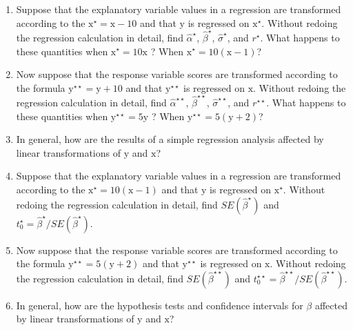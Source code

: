 \documentclass[]{article}
\begin{document}
\begin{enumerate}
\def\labelenumi{\arabic{enumi}.}
\item
  Suppose that the explanatory variable values in a regression are
  transformed according to the \(\mathrm{x}^{\star}=\mathrm{x}-10\) and
  that \(\mathrm{y}\) is regressed on \(\mathrm{x}^{\star}\). Without
  redoing the regression calculation in detail, find
  \(\hat{\alpha}^{\star}\), \(\hat{\beta}^{\star}\),
  \(\hat{\sigma}^{\star}\), and \(r^{\star}\). What happens to these
  quantities when \(\mathrm{x}^{\star}=10\mathrm{x}\) ? When
  \(\mathrm{x}^{\star}=10(\mathrm{x}-1)\)?
\item
  Now suppose that the response variable scores are transformed
  according to the formula \(\mathrm{y}^{\star\star}= \mathrm{y}+10\)
  and that \(\mathrm{y}^{\star\star}\) is regressed on \(\mathrm{x}\).
  Without redoing the regression calculation in detail, find
  \(\hat{\alpha}^{\star\star}\), \(\hat{\beta}^{\star\star}\),
  \(\hat{\sigma}^{\star\star}\), and \(r^{\star\star}\). What happens to
  these quantities when \(\mathrm{y}^{\star\star}=5\mathrm{y}\) ? When
  \(\mathrm{y}^{\star\star}=5(\mathrm{y}+2)\)?
\item
  In general, how are the results of a simple regression analysis
  affected by linear transformations of \(\mathrm{y}\) and
  \(\mathrm{x}\)?
\item
  Suppose that the explanatory variable values in a regression are
  transformed according to the \(\mathrm{x}^{\star}=10(\mathrm{x}-1)\)
  and that \(\mathrm{y}\) is regressed on \(\mathrm{x}^{\star}\).
  Without redoing the regression calculation in detail, find
  \(SE(\hat{\beta}^{\star})\) and
  \(t^{\star}_0= \hat{\beta}^{\star}/SE(\hat{\beta}^{\star})\).
\item
  Now suppose that the response variable scores are transformed
  according to the formula \(\mathrm{y}^{\star\star}=5(\mathrm{y}+2)\)
  and that \(\mathrm{y}^{\star\star}\) is regressed on \(\mathrm{x}\).
  Without redoing the regression calculation in detail, find
  \(SE(\hat{\beta}^{\star\star})\) and
  \(t^{\star\star}_0= \hat{\beta}^{\star\star}/SE(\hat{\beta}^{\star\star})\).
\item
  In general, how are the hypothesis tests and confidence intervals for
  \(\beta\) affected by linear transformations of \(\mathrm{y}\) and
  \(\mathrm{x}\)?
\end{enumerate}
\end{document}
